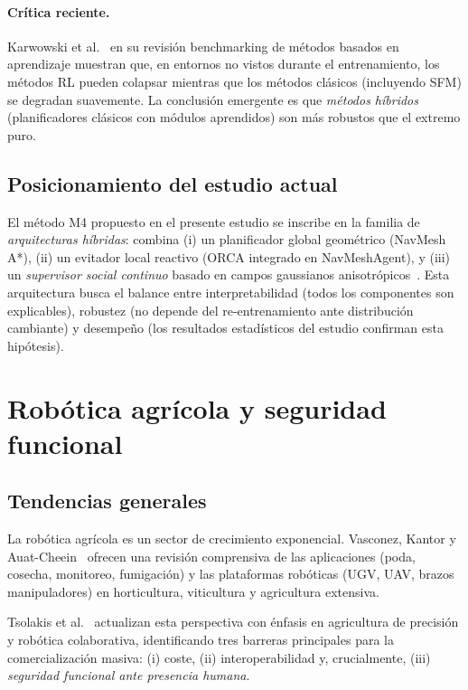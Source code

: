 \documentclass[12pt,a4paper,oneside]{book}
\begin{document}
\paragraph{Crítica reciente.} Karwowski et al.~\cite{Karwowski2024} en su revisión benchmarking de métodos basados en aprendizaje muestran que, en entornos no vistos durante el entrenamiento, los métodos RL pueden colapsar mientras que los métodos clásicos (incluyendo SFM) se degradan suavemente. La conclusión emergente es que \emph{métodos híbridos} (planificadores clásicos con módulos aprendidos) son más robustos que el extremo puro.

\subsection{Posicionamiento del estudio actual}

El método M4 propuesto en el presente estudio se inscribe en la familia de \emph{arquitecturas híbridas}: combina (i) un planificador global geométrico (NavMesh A*), (ii) un evitador local reactivo (ORCA integrado en NavMeshAgent), y (iii) un \emph{supervisor social continuo} basado en campos gaussianos anisotrópicos~\cite{Kirby2009,Neggers2024}. Esta arquitectura busca el balance entre interpretabilidad (todos los componentes son explicables), robustez (no depende del re-entrenamiento ante distribución cambiante) y desempeño (los resultados estadísticos del estudio confirman esta hipótesis).

\newpage
\section{Robótica agrícola y seguridad funcional}
\label{doc7:sec:agri}

\subsection{Tendencias generales}

La robótica agrícola es un sector de crecimiento exponencial. Vasconez, Kantor y Auat-Cheein~\cite{Vasconez2019} ofrecen una revisión comprensiva de las aplicaciones (poda, cosecha, monitoreo, fumigación) y las plataformas robóticas (UGV, UAV, brazos manipuladores) en horticultura, viticultura y agricultura extensiva.

Tsolakis et al.~\cite{Tsolakis2024} actualizan esta perspectiva con énfasis en agricultura de precisión y robótica colaborativa, identificando tres barreras principales para la comercialización masiva: (i) coste, (ii) interoperabilidad y, crucialmente, (iii) \emph{seguridad funcional ante presencia humana}.
\end{document}
